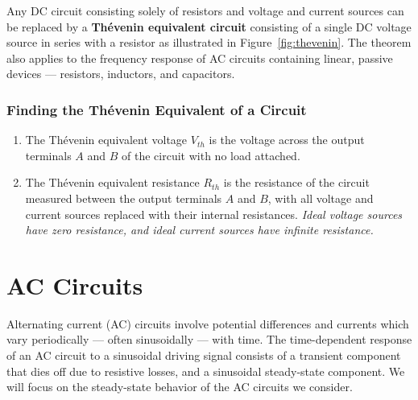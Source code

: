 \documentclass[11pt]{article}
\begin{document}
Any DC circuit consisting solely of resistors and voltage and current
sources can be replaced by a \textbf{Th\'{e}venin equivalent circuit}
consisting of a single DC voltage source in series with a resistor as
illustrated in Figure~\ref{fig:thevenin}. The theorem also applies to
the frequency response of AC circuits containing linear, passive
devices --- resistors, inductors, and capacitors.

\begin{latexonly}
  \noindent
  \hrulefill
\end{latexonly}
\htmlrule
\subsubsection*{Finding the Th\'{e}venin Equivalent of a Circuit}
\begin{enumerate}
\item The Th\'{e}venin equivalent voltage $V_{th}$ is the voltage
  across the output terminals $A$ and $B$ of the circuit with no
  load attached.

\item The Th\'{e}venin equivalent resistance $R_{th}$ is the
  resistance of the circuit measured between the output terminals $A$
  and $B$, with all voltage and current sources replaced with
  their internal resistances. \textit{Ideal voltage sources have
    zero resistance, and ideal current sources have infinite
    resistance.}
\end{enumerate}
\begin{latexonly}
  \noindent
  \hrulefill
\end{latexonly}
\htmlrule

\newpage

\section{AC Circuits}
\label{sec:AC}

Alternating current (AC) circuits involve potential differences and
currents which vary periodically --- often sinusoidally --- with time.
The time-dependent response of an AC circuit to a sinusoidal driving
signal consists of a transient component that dies off due to
resistive losses, and a sinusoidal steady-state component. We will
focus on the steady-state behavior of the AC circuits we consider.
\end{document}
